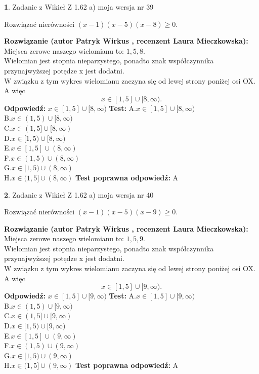 \documentclass[12pt, a4paper]{article}
\theoremstyle{definition} %
\newtheorem{zad}{}
\newcommand{\zadStart}[1]{\begin{zad}#1\newline}
\newcommand{\zadStop}{\end{zad}}
\newcommand{\rozwStart}[2]{\noindent \textbf{Rozwiązanie (autor #1 , recenzent #2): }\newline}
\newcommand{\rozwStop}{\newline}
\newcommand{\odpStart}{\noindent \textbf{Odpowiedź:}\newline}
\newcommand{\odpStop}{\newline}
\newcommand{\testStart}{\noindent \textbf{Test:}\newline}
\newcommand{\testStop}{\newline}
\newcommand{\kluczStart}{\noindent \textbf{Test poprawna odpowiedź:}\newline}
\newcommand{\kluczStop}{\newline}
\begin{document}
\zadStart{Zadanie z Wikieł Z 1.62 a) moja wersja nr 39}

Rozwiązać nierówności $(x-1)(x-5)(x-8)\ge0$.
\zadStop
\rozwStart{Patryk Wirkus}{Laura Mieczkowska}
Miejsca zerowe naszego wielomianu to: $1, 5, 8$.\\
Wielomian jest stopnia nieparzystego, ponadto znak współczynnika przy\linebreak najwyższej potędze x jest dodatni.\\ W związku z tym wykres wielomianu zaczyna się od lewej strony poniżej osi OX. A więc $$x \in [1,5] \cup [8,\infty).$$
\rozwStop
\odpStart
$x \in [1,5] \cup [8,\infty)$
\odpStop
\testStart
A.$x \in [1,5] \cup [8,\infty)$\\
B.$x \in (1,5) \cup [8,\infty)$\\
C.$x \in (1,5] \cup [8,\infty)$\\
D.$x \in [1,5) \cup [8,\infty)$\\
E.$x \in [1,5] \cup (8,\infty)$\\
F.$x \in (1,5) \cup (8,\infty)$\\
G.$x \in [1,5) \cup (8,\infty)$\\
H.$x \in (1,5] \cup (8,\infty)$
\testStop
\kluczStart
A
\kluczStop



\zadStart{Zadanie z Wikieł Z 1.62 a) moja wersja nr 40}

Rozwiązać nierówności $(x-1)(x-5)(x-9)\ge0$.
\zadStop
\rozwStart{Patryk Wirkus}{Laura Mieczkowska}
Miejsca zerowe naszego wielomianu to: $1, 5, 9$.\\
Wielomian jest stopnia nieparzystego, ponadto znak współczynnika przy\linebreak najwyższej potędze x jest dodatni.\\ W związku z tym wykres wielomianu zaczyna się od lewej strony poniżej osi OX. A więc $$x \in [1,5] \cup [9,\infty).$$
\rozwStop
\odpStart
$x \in [1,5] \cup [9,\infty)$
\odpStop
\testStart
A.$x \in [1,5] \cup [9,\infty)$\\
B.$x \in (1,5) \cup [9,\infty)$\\
C.$x \in (1,5] \cup [9,\infty)$\\
D.$x \in [1,5) \cup [9,\infty)$\\
E.$x \in [1,5] \cup (9,\infty)$\\
F.$x \in (1,5) \cup (9,\infty)$\\
G.$x \in [1,5) \cup (9,\infty)$\\
H.$x \in (1,5] \cup (9,\infty)$
\testStop
\kluczStart
A
\kluczStop
\end{document}
